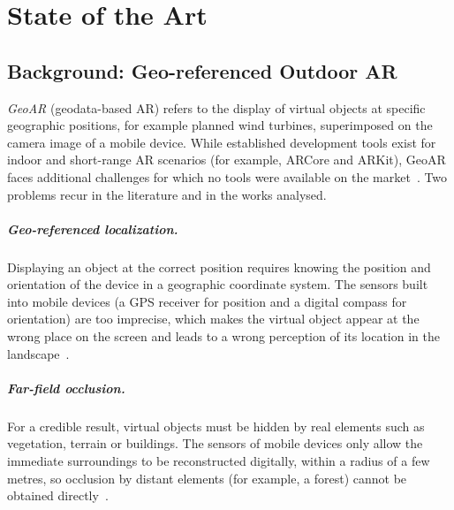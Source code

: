 \chapter{State of the Art}
\label{chap:state_of_the_art}

\begin{introduction}

\end{introduction}

\section{Background: Geo-referenced Outdoor AR}
\label{sec:sota_enquadramento}

\textit{GeoAR} (geodata-based AR) refers to the display of virtual objects at specific geographic positions, for example planned wind turbines, superimposed on the camera image of a mobile device. While established development tools exist for indoor and short-range AR scenarios (for example, ARCore and ARKit), GeoAR faces additional challenges for which no tools were available on the market~\cite[Sec.~2.2.2.1]{ar4wind2023}. Two problems recur in the literature and in the works analysed.

\paragraph{Geo-referenced localization.} Displaying an object at the correct position requires knowing the position and orientation of the device in a geographic coordinate system. The sensors built into mobile devices (a GPS receiver for position and a digital compass for orientation) are too imprecise, which makes the virtual object appear at the wrong place on the screen and leads to a wrong perception of its location in the landscape~\cite[Sec.~1.2 and 2.2.2.1]{ar4wind2023}.

\paragraph{Far-field occlusion.} For a credible result, virtual objects must be hidden by real elements such as vegetation, terrain or buildings. The sensors of mobile devices only allow the immediate surroundings to be reconstructed digitally, within a radius of a few metres, so occlusion by distant elements (for example, a forest) cannot be obtained directly~\cite[Sec.~2.2.2.1]{ar4wind2023}.


